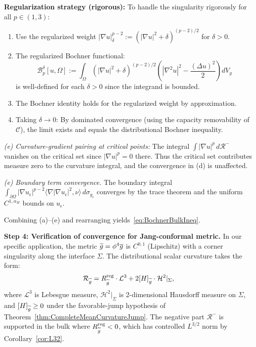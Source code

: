 \textbf{Regularization strategy (rigorous):} To handle the singularity rigorously for all $p \in (1, 3)$:
\begin{enumerate}
    \item[(a)] Use the regularized weight $|\nabla u|_\delta^{p-2} := (|\nabla u|^2 + \delta)^{(p-2)/2}$ for $\delta > 0$.
    
    \item[(b)] The regularized Bochner functional:
    \begin{equation}
        \mathcal{B}_p^\delta[u, \Omega] := \int_\Omega (|\nabla u|^2 + \delta)^{(p-2)/2} \left( |\nabla^2 u|^2 - \frac{(\Delta u)^2}{2} \right) dV_g
    \end{equation}
    is well-defined for each $\delta > 0$ since the integrand is bounded.
    
    \item[(c)] The Bochner identity holds for the regularized weight by approximation.
    
    \item[(d)] Taking $\delta \to 0$: By dominated convergence (using the capacity removability of $\mathcal{C}$), the limit exists and equals the distributional Bochner inequality.
\end{enumerate}

\textit{(e) Curvature-gradient pairing at critical points:} The integral $\int |\nabla u|^p \, d\mathcal{R}^-$ vanishes on the critical set since $|\nabla u|^p = 0$ there. Thus the critical set contributes measure zero to the curvature integral, and the convergence in (d) is unaffected.

\textit{(e) Boundary term convergence.} The boundary integral $\int_{\partial\Omega} |\nabla u_\epsilon|^{p-2} \langle \nabla |\nabla u_\epsilon|^2, \nu \rangle \, d\sigma_{g_\epsilon}$ converges by the trace theorem and the uniform $C^{1,\alpha_H}$ bounds on $u_\epsilon$.

Combining (a)--(e) and rearranging yields~\eqref{eq:BochnerBulkIneq}.

\textbf{Step 4: Verification of convergence for Jang-conformal metric.}
In our specific application, the metric $\widetilde{g} = \phi^4 \overline{g}$ is $C^{0,1}$ (Lipschitz) with a corner singularity along the interface $\Sigma$. The distributional scalar curvature takes the form:
\begin{equation}
    \mathcal{R}_{\widetilde{g}} = R_{\widetilde{g}}^{\text{reg}} \cdot \mathcal{L}^3 + 2[H]_{\widetilde{g}} \cdot \mathcal{H}^2|_\Sigma,
\end{equation}
where $\mathcal{L}^3$ is Lebesgue measure, $\mathcal{H}^2|_\Sigma$ is 2-dimensional Hausdorff measure on $\Sigma$, and $[H]_{\widetilde{g}} \ge 0$ under the favorable-jump hypothesis of Theorem~\ref{thm:CompleteMeanCurvatureJump}. The negative part $\mathcal{R}^-$ is supported in the bulk where $R_{\widetilde{g}}^{\text{reg}} < 0$, which has controlled $L^{3/2}$ norm by Corollary~\ref{cor:L32}.

